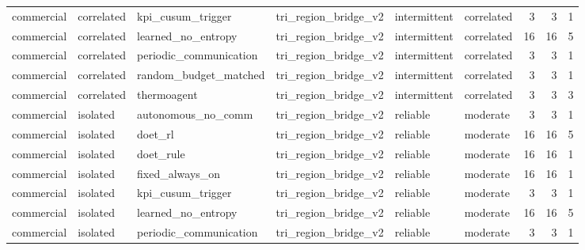 \begin{table}
\begin{tabular}{llllllrrr}
  commercial &              correlated &      kpi\_cusum\_trigger & tri\_region\_bridge\_v2 &  intermittent & correlated &         3 &                         3 &                         1 \\
  commercial &              correlated &     learned\_no\_entropy & tri\_region\_bridge\_v2 &  intermittent & correlated &        16 &                        16 &                         5 \\
  commercial &              correlated & periodic\_communication & tri\_region\_bridge\_v2 &  intermittent & correlated &         3 &                         3 &                         1 \\
  commercial &              correlated &  random\_budget\_matched & tri\_region\_bridge\_v2 &  intermittent & correlated &         3 &                         3 &                         1 \\
  commercial &              correlated &            thermoagent & tri\_region\_bridge\_v2 &  intermittent & correlated &         3 &                         3 &                         3 \\
  commercial &                isolated &     autonomous\_no\_comm & tri\_region\_bridge\_v2 &      reliable &   moderate &         3 &                         3 &                         1 \\
  commercial &                isolated &                doet\_rl & tri\_region\_bridge\_v2 &      reliable &   moderate &        16 &                        16 &                         5 \\
  commercial &                isolated &              doet\_rule & tri\_region\_bridge\_v2 &      reliable &   moderate &        16 &                        16 &                         1 \\
  commercial &                isolated &        fixed\_always\_on & tri\_region\_bridge\_v2 &      reliable &   moderate &        16 &                        16 &                         1 \\
  commercial &                isolated &      kpi\_cusum\_trigger & tri\_region\_bridge\_v2 &      reliable &   moderate &         3 &                         3 &                         1 \\
  commercial &                isolated &     learned\_no\_entropy & tri\_region\_bridge\_v2 &      reliable &   moderate &        16 &                        16 &                         5 \\
  commercial &                isolated & periodic\_communication & tri\_region\_bridge\_v2 &      reliable &   moderate &         3 &                         3 &                         1 \\

\end{tabular}
\end{table}
